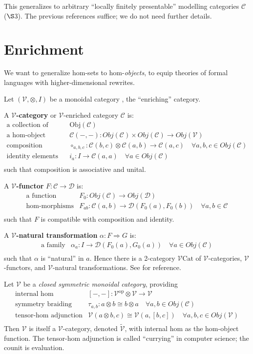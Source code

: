 \documentclass{amsart}
\theoremstyle{definition}
\newcommand{\Cat}{\mathrm{Cat}}
\newcommand{\op}{\mathrm{op}}
\newcommand{\V}{\mathscr{V}}
\newcommand{\D}{\mathscr{D}}
\newcommand{\C}{\mathscr{C}}
\newcommand{\maps}{\colon}
\begin{document}
This generalizes to arbitrary ``locally finitely presentable'' modelling categories $\C$ ($\S$3). The previous references suffice; we do not need further details. 

\section{Enrichment}
We want to generalize hom-sets to hom-\textit{objects}, to equip theories of formal languages with higher-dimensional rewrites.

Let $(\V,\otimes,I)$ be a monoidal category \cite{maclane}, the ``enriching'' category.

A \textbf{$\V$-category} or $\V$-enriched category $\C$ is:
\[\begin{array}{rl}
\text{a collection of objects} & \text{Obj}(\C)\\
\text{a hom-object function} & \C(-,-)\maps Obj(\C) \times Obj(\C) \to Obj(\V)\\
\text{composition morphisms} & \circ_{a,b,c}\maps\C(b,c) \otimes \C(a,b) \to \C(a,c) \quad \forall a,b,c \in Obj(\C)\\
\text{identity elements} & i_a\maps I\to\C(a,a) \quad \forall a \in Obj(\C)\\
\end{array}\]
such that composition is associative and unital.

A \textbf{$\V$-functor} $F\maps\C \to \D$ is:
\[\begin{array}{rl}
\text{a function} & F_0\maps Obj(\C) \to Obj(\D)\\
\text{hom-morphisms} & F_{ab}\maps \C(a,b) \to \D(F_0(a),F_0(b)) \quad \forall a,b \in \C\\
\end{array}\]
such that $F$ is compatible with composition and identity.

A \textbf{$\V$-natural transformation} $\alpha\maps F \Rightarrow G$ is:
\[\begin{array}{rl}
\text{a family} & \alpha_a\maps I \to \D(F_0(a),G_0(a)) \quad \forall a \in Obj(\C)\\
\end{array}\]
such that $\alpha$ is ``natural'' in $a$. Hence there is a 2-category \textbf{$\V\Cat$} of $\V$-categories, $\V$-functors, and $\V$-natural transformations. See \cite{enrich} for reference.

Let $\V$ be a \textit{closed symmetric monoidal category}, providing
\[\begin{array}{rl}
\text{internal hom} & [-,-]\maps\V^\op\otimes \V \to \V\\
\text{symmetry braiding} & \tau_{a,b}\maps a\otimes b\cong b\otimes a \quad \forall a,b \in Obj(\C)\\
\text{tensor-hom adjunction} & \V(a\otimes b,c) \cong \V(a,[b,c]) \quad \forall a,b,c \in Obj(\V)\\
\end{array}\]
Then $\V$ is itself a $\V$-category, denoted $\tilde{\V}$, with internal hom as the hom-object function. The tensor-hom adjunction is called ``currying'' in computer science; the counit is evaluation.
\end{document}
